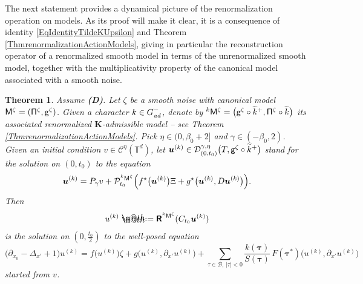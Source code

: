 \documentclass[10pt, reqno]{amsart}
\makeatletter
\numberwithin{subsection}{section}
\numberwithin{subsubsection}{subsection}
\numberwithin{equation}{section} %
\theoremstyle{mystyle}
\newtheorem{thm}{Theorem}
\theoremstyle{mystyle2}
\theoremstyle{mystyle3}
\newcommand{\REFD}{\textbf{\textsf{(D)}}}
\newcommand{\bsu}{\boldsymbol{u}}
\newcommand{\bstau}{\boldsymbol{\tau}}
\newcommand{\bbT}{\mathbb{T}}
\newcommand{\mcB}{\mathcal{B}}
\newcommand{\mcC}{\mathcal{C}}
\newcommand{\mcD}{\mathcal{D}}
\newcommand{\mcP}{\mathcal{P}}
\newcommand{\bfK}{\mathbf{K}}
\newcommand*{\defeq}{\mathrel{\rlap{%
                     \raisebox{0.3ex}{$\m@th\cdot$}}%
                     \raisebox{-0.3ex}{$\m@th\cdot$}}%
                     =}
\makeatother
\begin{document}
The next statement provides a dynamical picture of the renormalization operation on models. As its proof will make it clear, it is a consequence of identity \eqref{EqIdentityTildeKUpsilon} and Theorem \ref{ThmrenormalizationActionModels}, giving in particular the reconstruction operator of a 
renormalized smooth model in terms of the unrenormalized smooth model, together with the multiplicativity property of the canonical model associated with a smooth noise.  

\medskip

\begin{thm}   \label{ThmRenormPDEs}
Assume \REFD. Let $\zeta$ be a smooth noise with canonical model $\sf M^\zeta = (\Pi^\zeta, g^\zeta)$. Given a character $k\in G^-_\textrm{\emph{ad}}$, denote 
by $^k{\sf M}^\zeta = \big({\sf g}^\zeta\circ\widetilde{k}^+,{\sf\Pi}^\zeta\circ\widetilde{k}\big)$ its associated renormalized $\bfK$-admissible model -- see Theorem \ref{ThmrenormalizationActionModels}. Pick $\eta\in(0,\beta_0+2]$ and $\gamma\in(-\beta_0,2)$. Given an initial condition $v\in\mcC^\eta(\bbT^d)$, let $\bsu^{(k)}\in\mcD_{(0,t_0)}^{\gamma,\eta}\big(T, {\sf g}^\zeta\circ\widetilde{k}^+\big)$ stand for the solution on $(0,t_0)$ to the equation
$$
\bsu^{(k)} = P_\gamma v+\mcP_{t_0}^{{}^k{\sf M}^\zeta}
\Big(f^\star\big({\bsu^{(k)}}\big)\Xi + g^\star\big({\bsu^{(k)}},D{\bsu^{(k)}}\big)\Big).
$$
Then 
$$
u^{(k)} \defeq  \textbf{\textsf{R}}^{^k{\sf M}^\zeta}(C_{t_0}{\bsu^{(k)}})
$$
is the solution on $(0,\frac{t_0}2)$ to the well-posed equation
$$
\big(\partial_{x_0} - \Delta_{x'}+1\big) u^{(k)} = f\big({u^{(k)}}\big)\zeta + 
g\big({u^{(k)}},\partial_{x'}{u^{(k)}}\big) + \sum_{\tau\in \mcB,\, |\tau|<0} \frac{k(\bstau)}{S(\bstau)}\,F(\bstau^*)\big({u^{(k)}},\partial_{x'}{u^{(k)}}\big)
$$
started from $v$.
\end{thm}

\medskip
\end{document}
